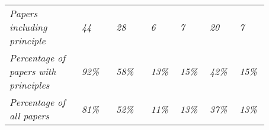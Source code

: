 \begin{landscape}
\begin{ThreePartTable}
\begin{longtable}{P{0.25\linewidth}P{0.12\linewidth}P{0.12\linewidth}P{0.08\linewidth}P{0.1\linewidth}P{0.1\linewidth}P{0.1\linewidth}}
    \midrule
        \textit{Papers including principle} & \textit{44} & \textit{28} & \textit{6} & \textit{7} & \textit{20} & \textit{7} \\ 
        \textit{Percentage of papers with principles} & \textit{92\%} & \textit{58\%} & \textit{13\%} & \textit{15\%} & \textit{42\%} & \textit{15\%} \\ 
        \textit{Percentage of all papers} & \textit{81\%} & \textit{52\%} & \textit{11\%} & \textit{13\%} & \textit{37\%} & \textit{13\%} \\  
\end{longtable}

\end{ThreePartTable}

\end{landscape}

\normalsize